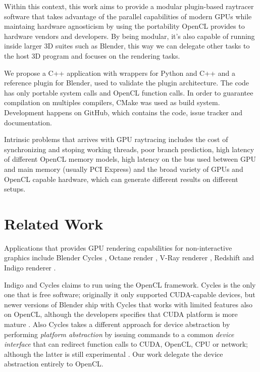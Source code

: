 \documentclass[a4paper]{sbgames}               %
\begin{document}
Within this context, this work aims to provide a modular plugin-based
raytracer software that takes advantage of the parallel capabilities
of modern GPUs while maintaing hardware agnosticism by using the
portability OpenCL provides to hardware vendors and developers. By
being modular, it's also capable of running inside larger 3D suites
such as Blender, this way we can delegate other tasks to the host 3D
program and focuses on the rendering tasks.

We propose a C++ application with wrappers for
Python %
and C++ and a reference plugin for Blender, used to validate the
plugin architecture. The code has only portable system calls and
OpenCL function calls. In order to guarantee compilation on multiples
compilers, CMake was used as build system. Development happens on
GitHub, which contains the code, issue tracker and
documentation.

Intrinsic problems that arrives with GPU raytracing includes the cost
of synchronizing and stoping working threads, poor branch prediction,
high latency of different OpenCL memory models, high latency on the
bus used between GPU and main memory (usually PCI Express) and the
broad variety of GPUs and OpenCL capable hardware, which can generate
different results on different setups.
\section{Related Work}
\label{sec:related-work}

Applications that provides GPU rendering capabilities for
non-interactive graphics include Blender Cycles\cite{Cycles} , Octane
render \cite{Octane}, V-Ray renderer \cite{VRAY}, Redshift
\cite{Redshift} and Indigo renderer \cite{Indigo}.

Indigo and Cycles claims to run using the OpenCL framework. Cycles
is the only one that is free software; originally it only supported
CUDA-capable devices, but newer versions of Blender ship with Cycles
that works with limited features also on OpenCL, although the
developers specifies that CUDA platform is more mature \cite{Cycles}.
Also Cycles takes a different approach for device abstraction by
performing \emph{platform abstraction} by issuing commands to a common
\emph{device interface} that can redirect function calls to CUDA,
OpenCL, CPU or network; although the latter is still experimental
\cite{CyclesDevel}. Our work delegate the device abstraction entirely
to OpenCL.
\end{document}
